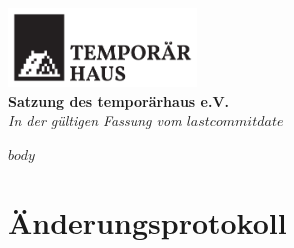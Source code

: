 \documentclass[a4paper, 11pt]{article} %
\begin{document}
\doublespacing
\thispagestyle{empty}
\begin{center}
\includegraphics[width=5.0cm]{template/logo.png}
\\
\vspace*{\fill}
{\LARGE \textbf{Satzung des temporärhaus e.V.}}\\
\vspace{2.5cm}
\textit{
	In der gültigen Fassung vom $lastcommitdate$
}
\vfill
\end{center}
\hspace*{-35cm}
\pagebreak
\setcounter{tocdepth}{2}
\tableofcontents
\pagebreak
\singlespacing
$body$
\newpage
\section{Änderungsprotokoll}

\end{document}
